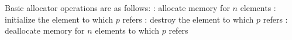 \documentclass{memo}
\begin{document}
Basic allocator operations are as follows:
\bit
{}: allocate memory for $n$ elements
: initialize the element to which $p$ refers
: destroy the element to which $p$ refers
: deallocate memory for $n$ elements to which $p$ refers
\eit

\end{document}
